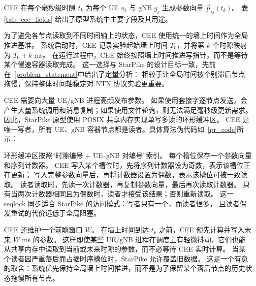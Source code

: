 CEE 在每个毫秒级时隙 $t_k$ 为每个 UE $u_i$ 与 gNB $g_j$ 生成参数向量 $\vec{p}_{ij}(t_k)$。
表\ref{tab_cee_fields} 给出了原型系统中主要字段及其用途。

为了避免各节点读取到不同时间轴上的状态，CEE 使用统一的墙上时间作为全局推进基准。
系统启动时，CEE 记录实验起始墙上时间 $T_0$，并将第 $k$ 个时隙映射为 $T_0+k$ ms。
在运行过程中，CEE 始终按照墙上时间推进写指针，而不是等待某个慢速容器读取完成。
这一选择与 StarPike 的设计目标一致，先前在~\ref{problem_statement}中给出了定量分析：
相较于让全局时间被个别滞后节点拖慢，保持整体时间轴稳定对 NTN 协议实验更重要。


CEE 需要向大量 UE/gNB 进程高频发布参数。
如果使用套接字逐节点发送，会产生大量系统调用和消息复制；如果使用文件轮询，则无法满足毫秒级更新需求。
因此，StarPike 原型使用 POSIX 共享内存实现单写多读的环形缓冲区。
CEE 是唯一写者，所有 UE、gNB 容器节点都是读者。具体算法伪代码如~\ref{pr_code}所示：

\begin{algorithm}[H]
    \caption{CEE 参数发布与节点读取流程}
    \label{pr_code}
\end{algorithm}

环形缓冲区按照“时隙编号 + UE--gNB 对编号”索引。
每个槽位保存一个参数向量和序列计数器。
CEE 写入某个槽位时，先将序列计数器设为奇数，表示该槽位正在更新；
写入完整参数向量后，再将计数器设置为偶数，表示该槽位可被一致读取。
读者读取时，先读一次计数器，再复制参数向量，最后再次读取计数器。
只有当两次计数器相同且为偶数时，读者才接受该结果；否则重新读取。
这一 seqlock 同步适合 StarPike 的访问模式：写者只有一个，而读者很多，
且读者偶发重试的代价远低于全局阻塞。

CEE 还维护一个前瞻窗口 $W$。
在墙上时间到达 $t_k$ 之前，CEE 预先计算并写入未来 $W$ ms 的参数。
这样即使某些 UE/gNB 进程在调度上有轻微抖动，它们也能从共享内存中读取到当前或未来时隙的参数，而不必等待 CEE 实时计算。
当某个读者因严重落后而占据时序槽位时，StarPike 允许覆盖旧数据。
这是一个有意的取舍：系统优先保持全局墙上时间推进，而不是为了保留某个落后节点的历史状态拖慢所有节点。

